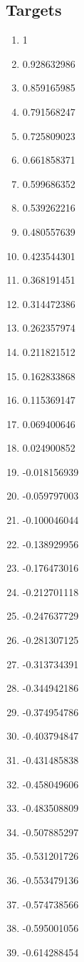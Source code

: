 \documentclass[6pt]{article}
\begin{document}
\subsection{Targets}
\begin{multicols}{4}
	\begin{enumerate}
		\item 1
		\item 0.928632986
		\item 0.859165985
		\item 0.791568247
		\item 0.725809023
		\item 0.661858371
		\item 0.599686352
		\item 0.539262216
		\item 0.480557639
		\item 0.423544301
		\item 0.368191451
		\item 0.314472386
		\item 0.262357974
		\item 0.211821512
		\item 0.162833868
		\item 0.115369147
		\item 0.069400646
		\item 0.024900852
		\item -0.018156939
		\item -0.059797003
		\item -0.100046044
		\item -0.138929956
		\item -0.176473016
		\item -0.212701118
		\item -0.247637729
		\item -0.281307125
		\item -0.313734391
		\item -0.344942186
		\item -0.374954786
		\item -0.403794847
		\item -0.431485838
		\item -0.458049606
		\item -0.483508809
		\item -0.507885297
		\item -0.531201726
		\item -0.553479136
		\item -0.574738566
		\item -0.595001056
		\item -0.614288454

\end{enumerate}
\end{multicols}
\end{document}
